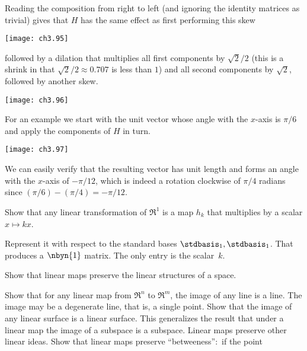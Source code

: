 \begin{exercises}
\begin{answer}
\begin{exparts}
        \partsitem Reading the composition from right to left (and ignoring the
          identity matrices as trivial) gives that $H$ has the same
          effect as first performing this skew 
          \begin{center}
            \texttt{[image: ch3.95]}
         \end{center}
         followed by a dilation that multiplies all first components by 
         $\sqrt{2}/2$ (this is a shrink in that $\sqrt{2}/2\approx0.707$ 
         is less than $1$) 
         and all second components by $\sqrt{2}$,
         followed by another skew. 
          \begin{center}
            \texttt{[image: ch3.96]}
         \end{center}
         For an example we start with the unit vector whose angle with
         the $x$-axis is $\pi/6$ and apply the components of $H$ in turn.
          \begin{center}
            \texttt{[image: ch3.97]}
         \end{center}
         We can easily verify that the resulting vector has unit length 
         and forms an angle with the $x$-axis of $-\pi/12$, which is indeed
         a rotation clockwise of $\pi/4$ radians 
         since $(\pi/6)-(\pi/4)=-\pi/12$. 
      \end{exparts}
    \end{answer}
  \item \label{exer:RToRIsScalMult} 
    Show that any linear transformation of $\Re^1$ is a map $h_k$
    that multiplies by a scalar $x\mapsto kx$.
    \begin{answer}
      Represent it with respect to the 
      standard bases $\stdbasis_1,\stdbasis_1$. 
      That produces a $\nbyn{1}$ matrix.
      The only entry is the scalar~$k$.
    \end{answer}
  \item \label{exer:ImageLinSurIsLinSur} 
    Show that linear maps preserve the linear structures of a space.
    \begin{exparts}
      \partsitem Show that for any linear map from $\Re^n$ to $\Re^m$,
         the image of any line is a line.
         The image may be a degenerate line, that is, a single point.
      \partsitem Show that the image of any linear surface is a linear surface.
         This generalizes the result that under a linear map the image of
         a subspace is a subspace.
      \partsitem Linear maps preserve other linear ideas.
         Show that linear maps preserve ``betweeness'':~if the point

\end{exparts}
\end{exercises}
